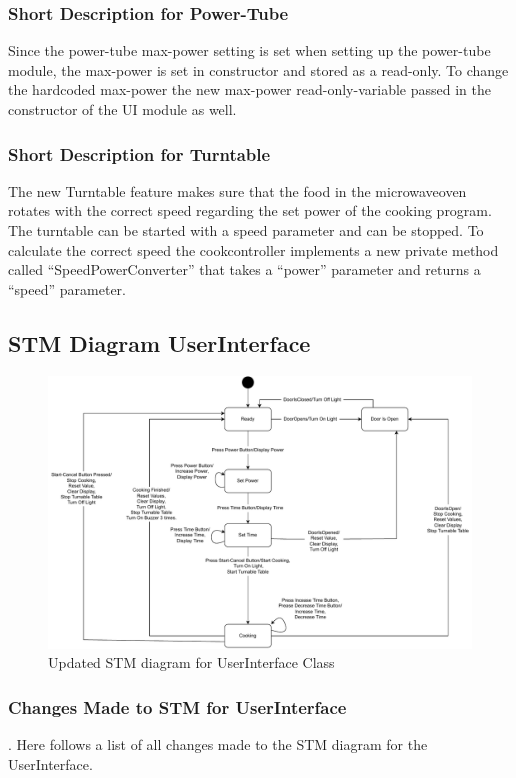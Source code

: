 \subsubsection{Short Description for Power-Tube}
Since the power-tube max-power setting is set when setting up the power-tube module, the max-power is set in constructor and stored as a read-only. To change the hardcoded max-power the new max-power read-only-variable passed in the constructor of the UI module as well.

\subsubsection{Short Description for Turntable}
The new Turntable feature makes sure that the food in the microwaveoven rotates with the correct speed regarding the set power of the cooking program. The turntable can be started with a speed parameter and can be stopped. To calculate the correct speed the cookcontroller implements a new private method called “SpeedPowerConverter” that takes a “power” parameter and returns a “speed” parameter. 


\newpage

\subsection{STM Diagram UserInterface}
\begin{figure}[h]
  \centering
  \includegraphics[scale=0.6]{02-Body/Image/STM_UserInterfacer.pdf}
  \caption{Updated STM diagram for UserInterface Class}%
  \label{fig:UserInterfaceSTM}
\end{figure}

\subsubsection{Changes Made to STM for UserInterface}.
Here follows a list of all changes made to the STM diagram for the UserInterface.

